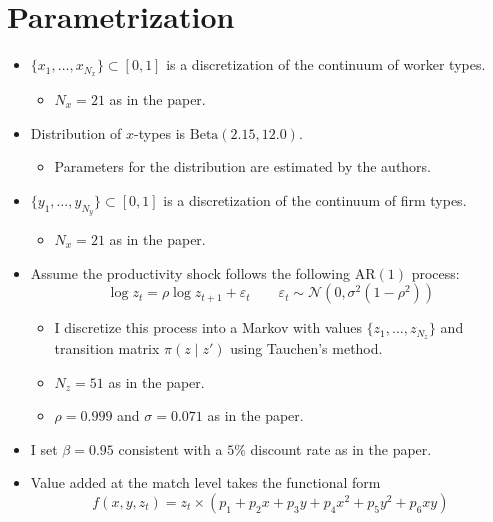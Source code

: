 \documentclass[
  letterpaper,
  DIV=11,
  numbers=noendperiod]{scrreprt}
\providecommand{\tightlist}{%
  \setlength{\itemsep}{0pt}\setlength{\parskip}{0pt}}\usepackage{longtable,booktabs,array}
\begin{document}
\hypertarget{parametrization}{%
\section{Parametrization}\label{parametrization}}

\begin{itemize}
\tightlist
\item
  \(\{x_1,\ldots,x_{N_x}\}\subset[0,1]\) is a discretization of the
  continuum of worker types.

  \begin{itemize}
  \tightlist
  \item
    \(N_x=21\) as in the paper.\\
  \end{itemize}
\item
  Distribution of \(x\)-types is \(\text{Beta}(2.15, 12.0)\).

  \begin{itemize}
  \tightlist
  \item
    Parameters for the distribution are estimated by the authors.
  \end{itemize}
\item
  \(\{y_1,\ldots,y_{N_y}\}\subset[0,1]\) is a discretization of the
  continuum of firm types.

  \begin{itemize}
  \tightlist
  \item
    \(N_x=21\) as in the paper.\\
  \end{itemize}
\item
  Assume the productivity shock follows the following \(\text{AR}(1)\)
  process:\[\log{z_{t}} = \rho \log{z_{t+1}}+\varepsilon_t \qquad \varepsilon_t \sim \mathcal{N}(0,\sigma^2(1-\rho^2))\]

  \begin{itemize}
  \tightlist
  \item
    I discretize this process into a Markov with values
    \(\{z_1,\ldots,z_{N_z}\}\) and transition matrix \(\pi(z\mid z')\)
    using Tauchen's method.
  \item
    \(N_z=51\) as in the paper.
  \item
    \(\rho=0.999\) and \(\sigma = 0.071\) as in the paper.
  \end{itemize}
\item
  I set \(\beta=0.95\) consistent with a \(5\%\) discount rate as in the
  paper.
\item
  Value added at the match level takes the functional
  form\[f(x,y,z_t) = z_t\times(p_1 + p_2 x + p_3y + p_4 x^2+ p_5 y^2 + p_6 xy)\]


\end{itemize}
\end{document}
